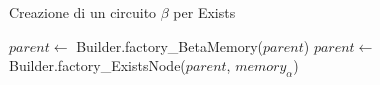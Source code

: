 
\begin{algorithm}[h]
\caption{Creazione di un circuito $\beta$ per Exists}\label{alg:builder-makeExists}
\begin{algorithmic}
\State $parent\gets$ Builder.factory\_BetaMemory($parent$)
\State $parent\gets$ Builder.factory\_ExistsNode($parent$, $memory_\alpha$)
\State {}
\EndFunction
\end{algorithmic}
\end{algorithm}


